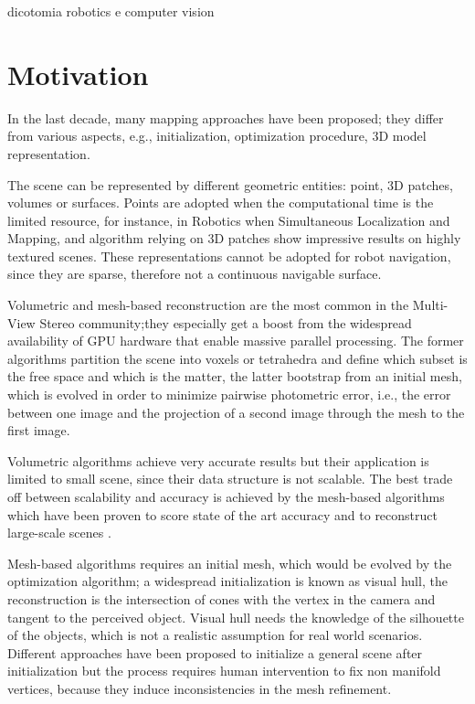 dicotomia robotics e computer vision

\section{Motivation}
In the last decade, many mapping approaches have been proposed; they differ from various aspects, e.g., initialization, optimization procedure, 3D model representation.

The scene can be represented by different geometric entities: point, 3D patches, volumes or surfaces.
Points are adopted when the computational time is the limited resource, for instance, in Robotics when Simultaneous Localization and Mapping, and algorithm relying on 3D patches show impressive results on highly textured scenes. 
These representations cannot be adopted for robot navigation, since they are sparse, therefore not a continuous navigable surface.

Volumetric and mesh-based reconstruction are the most common in the Multi-View Stereo community;they especially get a boost from the widespread availability of GPU hardware that enable massive parallel processing.
The former algorithms partition the scene into voxels or tetrahedra and define which subset is the free space and which is the matter, the latter bootstrap from an initial mesh, which is evolved in order to minimize pairwise photometric error, i.e., the error between one image and the projection of a second image through the mesh to the first image.

Volumetric algorithms achieve very accurate results but their application is limited to small scene, since their data structure is not scalable. 
The best trade off between scalability and accuracy is achieved by the mesh-based algorithms which have been proven to score state of the art accuracy \cite{li2015detail} and to reconstruct large-scale scenes \cite{vu_et_al_2012}.


Mesh-based algorithms requires an initial mesh, which would be evolved by the optimization algorithm; a widespread initialization is known as visual hull, the reconstruction is the intersection of cones with the vertex in the camera and tangent to the perceived object.
Visual hull needs the knowledge of the silhouette of the objects, which is not a realistic assumption for real world scenarios.
Different approaches have been proposed to initialize a general scene after initialization but the process requires human intervention to fix non manifold vertices, because they induce inconsistencies in the mesh refinement.

